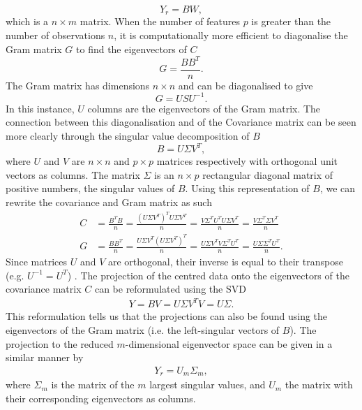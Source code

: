 \begin{equation}
Y_r = BW,
\end{equation}
which is a $n \times m$ matrix.
When the number of features $p$ is greater than the number of observations $n$, it is computationally more efficient to diagonalise the Gram matrix $G$ to find the eigenvectors of $C$
\begin{equation}
\label{eq:gram}
G = \frac{BB^T}{n}.
\end{equation}
The Gram matrix has dimensions $n \times n$ and can be diagonalised to give 
\begin{equation}
G = USU^{-1}.
\end{equation}
In this instance, $U$ columns are the eigenvectors of the Gram matrix. The connection between this diagonalisation and of the Covariance matrix can be seen more clearly through the singular value decomposition of $B$
\begin{equation}
B = U \Sigma V^T,
\end{equation}where $U$ and $V$ are $n \times n$ and $p \times p$ matrices respectively with orthogonal unit vectors as columns. The matrix $\Sigma$ is an $n \times p$ rectangular diagonal matrix of positive numbers, the singular values of $B$. Using this representation of $B$, we can rewrite the covariance and Gram matrix as such
\begin{align}
C &= \frac{B^TB}{n} = \frac{(U\Sigma V^T)^TU\Sigma V^T}{n} = \frac{V\Sigma^T U^TU\Sigma V^T}{n} = \frac{V \Sigma^T\Sigma V^T }{n} \\
G &= \frac{BB^T}{n} = \frac{U\Sigma V^T(U\Sigma V^T)^T}{n} = \frac{U\Sigma V^TV\Sigma^T U^T}{n} = \frac{U\Sigma \Sigma^T U^T}{n}.
\end{align}
Since matrices $U$ and $V$ are orthogonal,  their inverse is equal to their transpose (e.g. $U^{-1} = U^T$) \cite{franklin_matrix_2012}. The projection of the centred data onto the eigenvectors of the covariance matrix $C$ can be reformulated using the SVD
\begin{align}
Y = BV = U \Sigma V^T V = U \Sigma.
\end{align}
This reformulation tells us that the projections can also be found using the eigenvectors of the Gram matrix (i.e. the left-singular vectors of $B$). The projection to the reduced $m$-dimensional eigenvector space can be given in a similar manner by
\begin{align}
\label{eq:reducedGram}
Y_r = U_m \Sigma_m,
\end{align}
where $\Sigma_m$ is the matrix of the $m$ largest singular values, and $U_m$ the matrix with their corresponding eigenvectors as columns.

